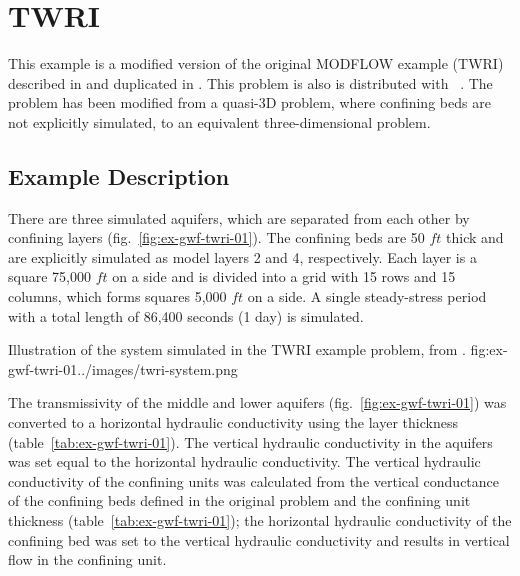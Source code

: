 \section{TWRI}

This example is a modified version of the original MODFLOW example (TWRI) described in \cite{modflow88} and duplicated in \cite{harbaugh1996user}. This problem is also is distributed with \mff~\citep{modflow2005}. The problem has been modified from a quasi-3D problem, where confining beds are not explicitly simulated, to an equivalent three-dimensional problem.

\subsection{Example Description}
There are three simulated aquifers, which are separated from each other by confining layers (fig.~\ref{fig:ex-gwf-twri-01}). The confining beds are 50 $ft$ thick and are explicitly simulated as model layers 2 and 4, respectively. Each layer is a square 75,000 $ft$ on a side and is divided into a grid with 15 rows and 15 columns, which forms squares 5,000 $ft$ on a side. A single steady-stress period with a total length of 86,400 seconds (1 day) is simulated.

\begin{StandardFigure}{
                                     Illustration of the system simulated in the TWRI example problem, from \cite{modflow88}.
                                     }{fig:ex-gwf-twri-01}{../images/twri-system.png}
\end{StandardFigure}                                 

The transmissivity of the middle and lower aquifers (fig.~\ref{fig:ex-gwf-twri-01}) was converted to a horizontal hydraulic conductivity using the layer thickness (table~\ref{tab:ex-gwf-twri-01}). The vertical hydraulic conductivity in the aquifers was set equal to the horizontal hydraulic conductivity. The vertical hydraulic conductivity of the confining units was calculated from the vertical conductance of the confining beds defined in the original problem and the confining unit thickness (table~\ref{tab:ex-gwf-twri-01}); the horizontal hydraulic conductivity of the confining bed was set to the vertical hydraulic conductivity and results in vertical flow in the confining unit.




